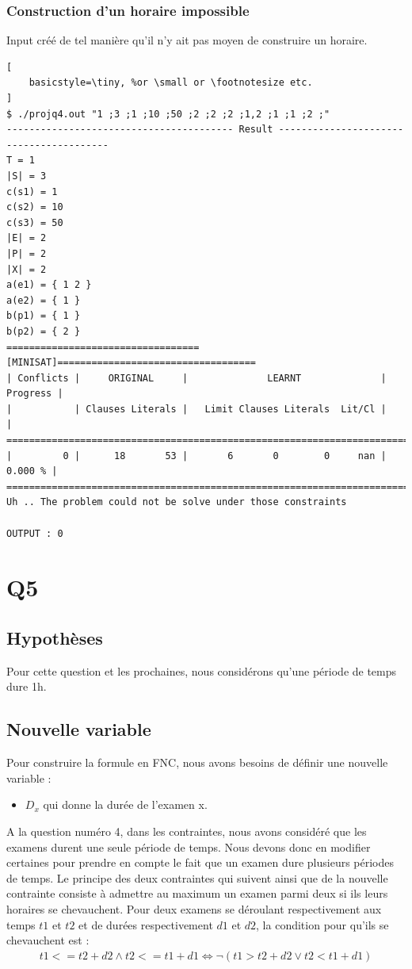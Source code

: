 \documentclass[a4paper,11pt]{article}
\begin{document}
\subsubsection{Construction d'un horaire impossible}
Input créé de tel manière qu'il n'y ait pas moyen de construire un horaire.
\begin{lstlisting}[
    basicstyle=\tiny, %or \small or \footnotesize etc.
]
$ ./projq4.out "1 ;3 ;1 ;10 ;50 ;2 ;2 ;2 ;1,2 ;1 ;1 ;2 ;"
---------------------------------------- Result ----------------------------------------
T = 1
|S| = 3
c(s1) = 1
c(s2) = 10
c(s3) = 50
|E| = 2
|P| = 2
|X| = 2
a(e1) = { 1 2 }
a(e2) = { 1 }
b(p1) = { 1 }
b(p2) = { 2 }
==================================[MINISAT]===================================
| Conflicts |     ORIGINAL     |              LEARNT              | Progress |
|           | Clauses Literals |   Limit Clauses Literals  Lit/Cl |          |
==============================================================================
|         0 |      18       53 |       6       0        0     nan |  0.000 % |
==============================================================================
Uh .. The problem could not be solve under those constraints

OUTPUT : 0
\end{lstlisting}

\section{Q5}

\subsection{Hypothèses}
Pour cette question et les prochaines, nous considérons qu'une période de temps dure 1h.

\subsection{Nouvelle variable}

Pour construire la formule en FNC, nous avons besoins de définir une nouvelle variable :  
\begin{itemize}
	\item \( D_{x}\) qui donne la durée de l'examen x.
\end{itemize}

A la question numéro 4, dans les contraintes, nous avons considéré que les examens durent une seule période de temps. Nous devons donc en modifier certaines pour prendre en compte le fait que un examen dure plusieurs périodes de temps. 
Le principe des deux contraintes qui suivent ainsi que de la nouvelle contrainte consiste à admettre au maximum un examen parmi deux si ils leurs horaires se chevauchent. Pour deux examens se déroulant respectivement aux temps $t1$ et $t2$ et de durées respectivement $d1$ et $d2$, la condition pour qu'ils se chevauchent est : 
\begin{align}
t1 <= t2 + d2 \wedge t2 <= t1 + d1
\iff \neg (t1 > t2 + d2 \vee t2 < t1 + d1)
\end{align}
\end{document}
